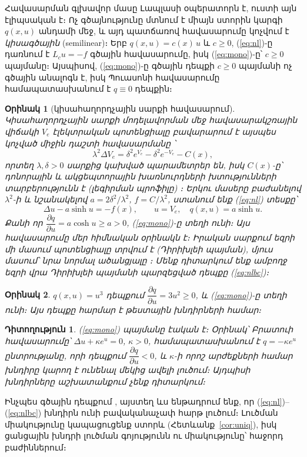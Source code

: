 \documentclass[12pt,a4paper]{article}
\theoremstyle{arm}
\theoremstyle{armdef}
\newtheorem{remark}{Դիտողություն}
\newtheorem{example}{Օրինակ}
\numberwithin{equation}{section}
\newcommand{\dd}[2]{\dfrac{\partial #1}{\partial #2}}
\begin{document}
Հավասարման գլխավոր մասը Լապլասի օպերատորն է, ուստի այն էլիպսական է։ Ոչ գծայնությունը մտնում է միայն ստորին կարգի $q(x,u)$ անդամի մեջ, և այդ պատճառով հավասարումը կոչվում է \emph{կիսագծային} (semilinear)։ Երբ $q(x,u)=c(x)\,u$ և $c\ge0$, (\ref{eq:nl})-ը դառնում է $L_cu=-f$ գծային հավասարումը, իսկ (\ref{eq:mono})-ը՝ $c\ge0$ պայմանը։ Այսպիսով, (\ref{eq:mono})-ը գծային դեպքի $c\ge0$ պայմանի ոչ գծային անալոգն է, իսկ Պուասոնի հավասարումը համապատասխանում է $q\equiv0$ դեպքին։

\begin{example}[կիսահաղորդչային սարքի հավասարում]\label{ex:semi}
Կիսահաղորդչային սարքի մոդելավորման մեջ հավասարակշռային վիճակի $V_e$ էլեկտրական պոտենցիալը բավարարում է այսպես կոչված միջին դաշտի հավասարմանը \cite[գլ.~5, էջ~82--83]{mark}՝
\[\lambda^2\Delta V_e=\delta^2e^{V_e}-\delta^2e^{-V_e}-C(x),\]
որտեղ $\lambda,\delta>0$ սարքից կախված պարամետրեր են, իսկ $C(x)$-ը՝ դոնորային և ակցեպտորային խառնուրդների խտությունների տարբերությունն է (լեգիրման պրոֆիլը) \cite[էջ~73]{mark}։ Երկու մասերը բաժանելով $\lambda^2$-ի և նշանակելով $a=2\delta^2/\lambda^2$, $f=C/\lambda^2$, ստանում ենք (\ref{eq:nl}) տեսքը՝
\[\Delta u-a\sinh u=-f(x),\qquad u=V_e,\quad q(x,u)=a\sinh u.\]
Քանի որ $\dd{q}{u}=a\cosh u\ge a>0$, (\ref{eq:mono})-ը տեղի ունի։ Այս հավասարումը մեր հիմնական օրինակն է։ Իրական սարքում եզրի մի մասում պոտենցիալը տրվում է (Դիրիխլեի պայման), մյուս մասում՝ նրա նորմալ ածանցյալը \cite[էջ~83]{mark}։ Մենք դիտարկում ենք ամբողջ եզրի վրա Դիրիխլեի պայմանի պարզեցված դեպքը (\ref{eq:nlbc})։
\end{example}

\begin{example}
$q(x,u)=u^3$ դեպքում $\dd{q}{u}=3u^2\ge0$, և (\ref{eq:mono})-ը տեղի ունի։ Այս դեպքը հարմար է թեստային խնդիրների համար։
\end{example}

\begin{remark}
(\ref{eq:mono}) պայմանը էական է։ Օրինակ՝ Բրատուի հավասարումը՝ $\Delta u+\kappa e^{u}=0$, $\kappa>0$, համապատասխանում է $q=-\kappa e^u$ ընտրությանը, որի դեպքում $\dd{q}{u}<0$, և $\kappa$-ի որոշ արժեքների համար խնդիրը կարող է ունենալ մեկից ավելի լուծում։ Այդպիսի խնդիրները աշխատանքում չենք դիտարկում։
\end{remark}

Ինչպես գծային դեպքում \cite{sam}, այստեղ ևս ենթադրում ենք, որ (\ref{eq:nl})--(\ref{eq:nlbc}) խնդիրն ունի բավականաչափ հարթ լուծում։ Լուծման միակությունը կապացուցենք ստորև (Հետևանք~\ref{cor:uniq}), իսկ ցանցային խնդրի լուծման գոյությունն ու միակությունը՝ հաջորդ բաժիններում։
\end{document}

